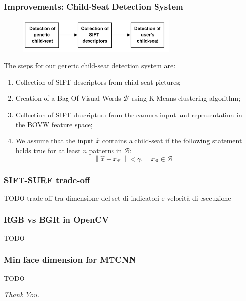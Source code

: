 \documentclass{beamer}
\newcommand{\norm}[1]{\left\lVert#1\right\rVert}
\begin{document}
	\begin{frame}
		\frametitle{Improvements: Child-Seat Detection System}
		\begin{figure}
			\centering
			\includegraphics[width=0.7\textwidth]{img/SIFT_collection.png}
		\end{figure}
		The steps for our generic child-seat detection system are:
		
		\begin{enumerate}
			\item Collection of SIFT descriptors from child-seat pictures;
			\item Creation of a Bag Of Visual Words $\mathcal{B}$ using K-Means clustering algorithm;
			\item Collection of SIFT descriptors from the camera input and representation in the BOVW feature space;
			\item We assume that the input $\hat{x}$ contains a child-seat if the following statement holds true for at least $n$ patterns in $\mathcal{B}$:
				\begin{equation*}
				\norm{\hat{x} - x_{\mathcal{B}}} < \gamma,
				\quad x_{\mathcal{B}} \in \mathcal{B}
				\end{equation*}
		\end{enumerate}		
	\end{frame}

	\begin{frame}
		\frametitle{SIFT-SURF trade-off}
		TODO trade-off tra dimensione del set di indicatori e velocità di esecuzione
	\end{frame}
	
	\begin{frame}
		\frametitle{RGB vs BGR in OpenCV}
		TODO
	\end{frame}
	
	\begin{frame}
		\frametitle{Min face dimension for MTCNN}
		TODO
	\end{frame}
	
	\begin{frame}
		\centering \Huge
		\emph{Thank You.}
	\end{frame}
\end{document}
